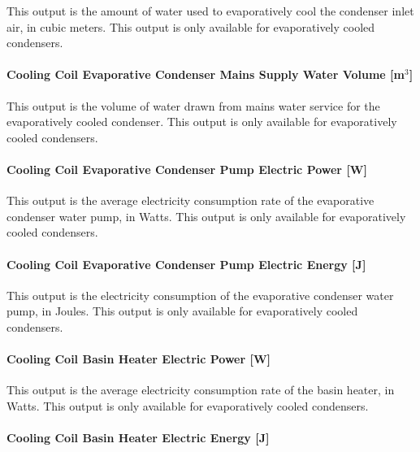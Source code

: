 This output is the amount of water used to evaporatively cool the condenser inlet air, in cubic meters. This output is only available for evaporatively cooled condensers.

\paragraph{Cooling Coil Evaporative Condenser Mains Supply Water Volume {[}m\(^{3}\){]}}\label{cooling-coil-evaporative-condenser-mains-supply-water-volume-m3-2}

This output is the volume of water drawn from mains water service for the evaporatively cooled condenser. This output is only available for evaporatively cooled condensers.

\paragraph{Cooling Coil Evaporative Condenser Pump Electric Power {[}W{]}}\label{cooling-coil-evaporative-condenser-pump-electric-power-w-1}

This output is the average electricity consumption rate of the evaporative condenser water pump, in Watts. This output is only available for evaporatively cooled condensers.

\paragraph{Cooling Coil Evaporative Condenser Pump Electric Energy {[}J{]}}\label{cooling-coil-evaporative-condenser-pump-electric-energy-j-2}

This output is the electricity consumption of the evaporative condenser water pump, in Joules. This output is only available for evaporatively cooled condensers.

\paragraph{Cooling Coil Basin Heater Electric Power {[}W{]}}\label{cooling-coil-basin-heater-electric-power-w-2}

This output is the average electricity consumption rate of the basin heater, in Watts. This output is only available for evaporatively cooled condensers.

\paragraph{Cooling Coil Basin Heater Electric Energy {[}J{]}}\label{cooling-coil-basin-heater-electric-energy-j-2}

